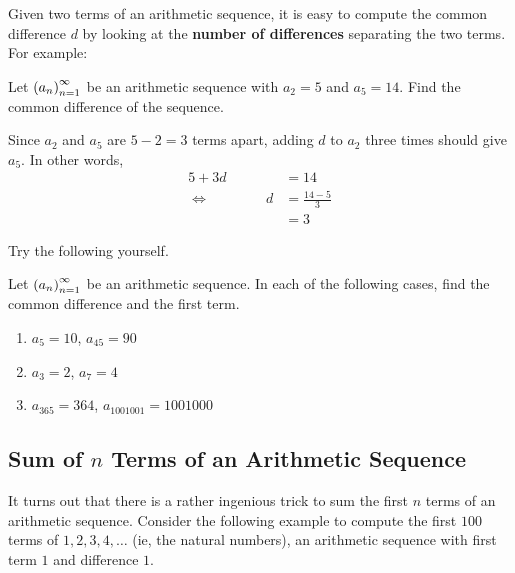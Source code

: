 Given two terms of an arithmetic sequence, it is easy to compute the common difference $d$ by looking at the \textbf{number of differences} separating the two terms. For example:

\begin{boxexample}
Let $\left( a_n \right)_{n=1}^{\infty}$ be an arithmetic sequence with $a_2 = 5$ and $a_5 = 14$. Find the common difference of the sequence.
\begin{solution}
Since $a_2$ and $a_5$ are $5 - 2 = 3$ terms apart, adding $d$ to $a_2$ three times should give $a_5$. In other words,
\begin{align*}
    5 + 3d &= 14 \\
    \iff \quad \quad \quad \quad d &= \frac{14 - 5}{3} \\
    &= 3
\end{align*}
\end{solution}
\vspace{-3em}
\end{boxexample}

Try the following yourself.

\begin{boxexercise}
Let $\left( a_n \right)_{n=1}^{\infty}$ be an arithmetic sequence. In each of the following cases, find the common difference and the first term.
\begin{enumerate}[noitemsep]
    \item $a_5 = 10$, $a_{45} = 90$
    \item $a_3 = 2$, $a_7 = 4$
    \item $a_{365} = 364$, $a_{1001001} = 1001000$
\end{enumerate}
\end{boxexercise}

\subsection{Sum of $n$ Terms of an Arithmetic Sequence}

It turns out that there is a rather ingenious trick to sum the first $n$ terms of an arithmetic sequence. Consider the following example to compute the first $100$ terms of $1, 2, 3, 4, \ldots$ (ie, the natural numbers), an arithmetic sequence with first term $1$ and difference $1$.

